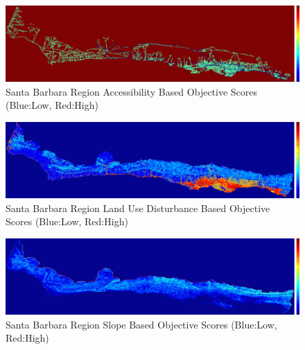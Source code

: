         \begin{figure}[!h]
            \begin{center}
            \includegraphics[width=5.5in]{figures/SantaBarbara_AccessibilityScore.png}   
            \caption{Santa Barbara Region Accessibility Based Objective Scores (Blue:Low, Red:High)}
            \label{fig:SBaccessibilty}
            \end{center}
        \end{figure}

        \begin{figure}[!h]
            \begin{center}
            \includegraphics[width=5.5in]{figures/SantaBarbara_DisturbanceScore.png}   
            \caption{Santa Barbara Region Land Use Disturbance Based Objective Scores (Blue:Low, Red:High)}
            \label{fig:SBdisturbance}
            \end{center}
        \end{figure}
        
        \begin{figure}[!h]
            \begin{center}
            \includegraphics[width=5.5in]{figures/SantaBarbara_SlopeScore.png}   
            \caption{Santa Barbara Region Slope Based Objective Scores (Blue:Low, Red:High)}
            \label{fig:SBslope}
            \end{center}
        \end{figure}
        

